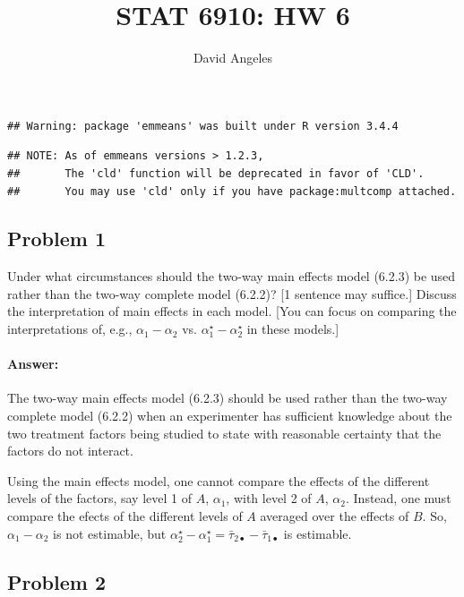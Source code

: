 \documentclass[12pt,]{article}
\title{STAT 6910: HW 6}
\author{David Angeles}
\date{}
\let\oldparagraph\paragraph
\renewcommand{\paragraph}[1]{\oldparagraph{#1}\mbox{}}
\begin{document}
\maketitle

\begin{verbatim}
## Warning: package 'emmeans' was built under R version 3.4.4
\end{verbatim}

\begin{verbatim}
## NOTE: As of emmeans versions > 1.2.3,
##       The 'cld' function will be deprecated in favor of 'CLD'.
##       You may use 'cld' only if you have package:multcomp attached.
\end{verbatim}

\subsection{Problem 1}\label{problem-1}

Under what circumstances should the two-way main effects model (6.2.3)
be used rather than the two-way complete model (6.2.2)? {[}1 sentence
may suffice.{]} Discuss the interpretation of main effects in each
model. {[}You can focus on comparing the interpretations of, e.g.,
\(\alpha_1 - \alpha_2\) vs. \(\alpha_1^\star - \alpha_2^\star\) in these
models.{]}

\paragraph{Answer:}\label{answer}

The two-way main effects model (6.2.3) should be used rather than the
two-way complete model (6.2.2) when an experimenter has sufficient
knowledge about the two treatment factors being studied to state with
reasonable certainty that the factors do not interact.

Using the main effects model, one cannot compare the effects of the
different levels of the factors, say level 1 of \(A\), \(\alpha_1\),
with level 2 of \(A\), \(\alpha_2\). Instead, one must compare the
efects of the different levels of \(A\) averaged over the effects of
\(B\). So, \(\alpha_1-\alpha_2\) is not estimable, but
\(\alpha^\star_2-\alpha^\star_1=\bar{\tau}_{2\bullet}-\bar{\tau}_{1\bullet}\)
is estimable.

\subsection{Problem 2}\label{problem-2}
\end{document}

